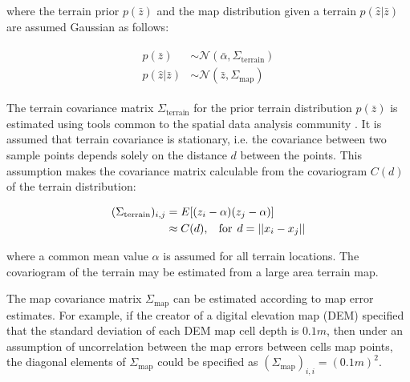 \noindent where the terrain prior $p(\bar{z})$ and the map distribution given a terrain $p(\hat{z}|\bar{z})$ are assumed Gaussian as follows:

\begin{align}
\begin{split}
p(\bar{z}) &\sim \mathcal{N}(\bar{\alpha}, \Sigma_{\text{terrain}}) \\
p(\hat{z}|\bar{z}) &\sim \mathcal{N}(\bar{z}, \Sigma_{\text{map}})
\label{eq:terrainGaussians}
\end{split}
\end{align}

The terrain covariance matrix $\Sigma_{\text{terrain}}$ for the prior terrain distribution $p(\bar{z})$ is estimated using tools common to the spatial data analysis community \cite{Cressie1993}.  It is assumed  that terrain covariance is stationary, i.e. the covariance between two sample points depends solely on the distance $d$ between the points.  This assumption makes the covariance matrix calculable from the covariogram $C(d)$ of the terrain distribution:

\begin{align}
\begin{split}
(\Sigma_{\text{terrain}})_{i,j} &= E[(z_i - \alpha)(z_j - \alpha)] \\
&\approx C(d), \hspace{2ex} \text{for} \hspace{1ex} d = ||x_i - x_j|| \\
\label{eq:covariogram}
\end{split}
\end{align}

\noindent where a common mean value $\alpha$ is assumed for all terrain locations. The covariogram of the terrain may be estimated from a large area terrain map.  

The map covariance matrix $\Sigma_{\text{map}}$ can be estimated according to map error estimates.  For example, if the creator of a digital elevation map (DEM) specified that the standard deviation of each DEM map cell depth is $0.1m$, then under an assumption of uncorrelation between the map errors between cells map points, the diagonal elements of $\Sigma_{\text{map}}$ could be specified as $(\Sigma_{\text{map}})_{i,i} = (0.1m)^2$.

